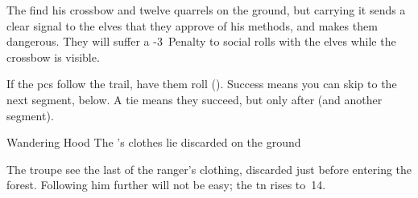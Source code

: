 The find his crossbow and twelve quarrels on the ground, but carrying it sends a clear signal to the elves that they approve of his methods, and makes them dangerous.
They will suffer a -3~Penalty to social rolls with the elves while the crossbow is visible.

If the \glspl{pc} follow the trail, have them roll  (\tn[10]).
Success means you can skip to the next \gls{segment}, below.
A tie means they succeed, but only after  (and another \gls{segment}).

{Wandering Hood}%
{The 's clothes lie discarded on the ground}%

The troupe see the last of the ranger's clothing, discarded just before entering the forest.
Following him further will not be easy; the \gls{tn} rises to~14.


